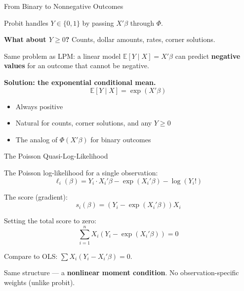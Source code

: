 \documentclass[aspectratio=169]{beamer}
\numberwithin{equation}{section}
\begin{document}
\begin{frame}{From Binary to Nonnegative Outcomes}

Probit handles $Y \in \{0,1\}$ by passing $X'\beta$ through $\Phi$.

\pause

\textbf{What about $Y \geq 0$?} Counts, dollar amounts, rates, corner solutions.

\pause

\bigskip

Same problem as LPM: a linear model $\mathbb{E}[Y \mid X] = X'\beta$ can predict \textbf{negative values} for an outcome that cannot be negative.

\pause

\bigskip

\textbf{Solution: the exponential conditional mean.}
\[
\mathbb{E}[Y \mid X] = \exp(X'\beta)
\]

\begin{itemize}
    \item Always positive
    \item Natural for counts, corner solutions, and any $Y \geq 0$
    \item The analog of $\Phi(X'\beta)$ for binary outcomes
\end{itemize}

\end{frame}


\begin{frame}{The Poisson Quasi-Log-Likelihood}

The Poisson log-likelihood for a single observation:
\[
\ell_i(\beta) = Y_i \cdot X_i'\beta - \exp(X_i'\beta) - \log(Y_i!)
\]

\pause

The score (gradient):
\[
s_i(\beta) = \left(Y_i - \exp(X_i'\beta)\right) X_i
\]

\pause

Setting the total score to zero:
\[
\boxed{\sum_{i=1}^n X_i\left(Y_i - \exp(X_i'\beta)\right) = 0}
\]

\pause

\bigskip

Compare to OLS: $\sum X_i(Y_i - X_i'\beta) = 0$.

\medskip

Same structure --- a \textbf{nonlinear moment condition}. No observation-specific weights (unlike probit).

\end{frame}
\end{document}

